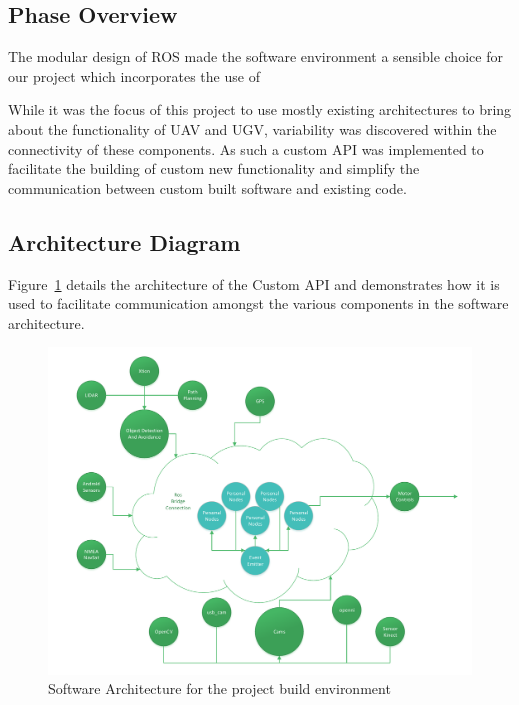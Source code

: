 \subsection{Phase Overview}
The modular design of ROS made the software environment a sensible choice for our project which incorporates the use of 

While it was the focus of this project to use mostly existing architectures to bring
about the functionality of UAV and UGV, variability was discovered within the 
connectivity of these components.  As such a custom API was implemented to
facilitate the building of custom new functionality and simplify the communication
between custom built software and existing code.

\subsection{ Architecture  Diagram}
Figure~\ref{apinode} details the architecture of the Custom API and demonstrates how it is used to facilitate communication amongst the various components in the software architecture.

\begin{figure}[tbh]
\begin{center}
\includegraphics[width=1\textwidth]{resources/diagram/API_Node_v2}
\end{center}
\caption{Software Architecture for the project build environment \label{apinode}}
\end{figure}



